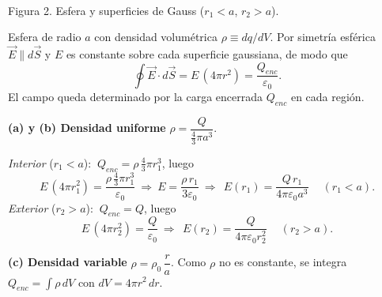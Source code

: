 \documentclass[12pt,letterpaper]{article}
\newcommand{\secgap}{\vspace{0.55cm}}
\begin{document}
\noindent
\begin{minipage}[c]{0.32\textwidth}
\centering
{}\\[2pt]
{\scriptsize Figura 2. Esfera y superficies de Gauss ($r_1<a$, $r_2>a$).}
\end{minipage}%
\hfill
\begin{minipage}[c]{0.63\textwidth}
Esfera de radio $a$ con densidad volum\'etrica $\rho\equiv dq/dV$. Por simetr\'ia esf\'erica
$\vec E\parallel d\vec S$ y $E$ es constante sobre cada superficie gaussiana, de modo que
\[
    \oint\vec E\cdot d\vec S=E\,(4\pi r^{2})=\frac{Q_{enc}}{\varepsilon_0}.
\]
El campo queda determinado por la carga encerrada $Q_{enc}$ en cada regi\'on.
\end{minipage}

\secgap

\noindent\textbf{(a) y (b) Densidad uniforme} $\rho=\dfrac{Q}{\tfrac{4}{3}\pi a^{3}}$.

\smallskip
\noindent\emph{Interior} ($r_1<a$): $\ Q_{enc}=\rho\,\tfrac{4}{3}\pi r_1^{3}$, luego
\[
    E\,(4\pi r_1^{2})=\frac{\rho\,\tfrac{4}{3}\pi r_1^{3}}{\varepsilon_0}
    \ \Longrightarrow\
    E=\frac{\rho\,r_1}{3\varepsilon_0}
    \ \Longrightarrow\
    \boxed{\ E(r_1)=\frac{Q\,r_1}{4\pi\varepsilon_0 a^{3}}\ }\quad(r_1<a).
\]
\noindent\emph{Exterior} ($r_2>a$): $\ Q_{enc}=Q$, luego
\[
    E\,(4\pi r_2^{2})=\frac{Q}{\varepsilon_0}
    \ \Longrightarrow\
    \boxed{\ E(r_2)=\frac{Q}{4\pi\varepsilon_0 r_2^{2}}\ }\quad(r_2>a).
\]

\secgap

\noindent\textbf{(c) Densidad variable} $\rho=\rho_0\,\dfrac{r}{a}$. Como $\rho$ no es constante, se integra
$Q_{enc}=\displaystyle\int\rho\,dV$ con $dV=4\pi r^{2}\,dr$.
\end{document}
